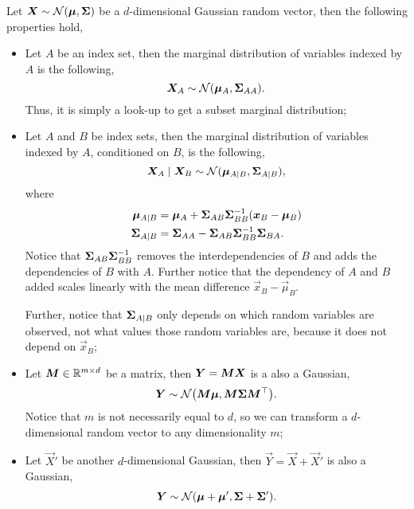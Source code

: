 Let $\bm{X} \sim \mathcal{N}(\bm{\mu},\bm{\Sigma})$ be a $d$-dimensional
Gaussian random vector, then the following properties hold,
\begin{itemize}
    \item Let $A$ be an index set, then the marginal distribution of variables
          indexed by $A$ is the following, \[
              \bm{X}_A \sim \mathcal{N}(\bm{\mu}_A,\bm{\Sigma}_{AA}).
          \]
          Thus, it is simply a look-up to get a subset marginal distribution;

    \item Let $A$ and $B$ be index sets, then the marginal distribution of
          variables indexed by $A$, conditioned on $B$, is the following, \[
              \bm{X}_A\mid \bm{X}_B \sim \mathcal{N}(\bm{\mu}_{A\mid B},\bm{\Sigma}_{A\mid B}),
          \]
          where
          \begin{align*}
              \bm{\mu}_{A\mid B}    & = \bm{\mu}_A + \bm{\Sigma}_{AB}\bm{\Sigma}_{BB}^{-1} (\bm{x}_B - \bm{\mu}_B) \\
              \bm{\Sigma}_{A\mid B} & = \bm{\Sigma}_{AA} - \bm{\Sigma}_{AB}\bm{\Sigma}_{BB}^{-1}\bm{\Sigma}_{BA}.
          \end{align*}
          Notice that $\bm{\Sigma}_{AB}\bm{\Sigma}_{BB}^{-1}$ removes the interdependencies
          of $B$ and adds the dependencies of $B$ with $A$. Further notice that the
          dependency of $A$ and $B$ added scales linearly with the mean difference
          $\vec{x}_B - \vec{\mu}_B$.

          Further, notice that $\bm{\Sigma}_{A\mid B}$ only depends on which random
          variables are observed, not what values those random variables are, because
          it does not depend on $\vec{x}_B$;

    \item Let $\bm{M}\in\mathbb{R}^{m\times d}$ be a matrix, then $\bm{Y} =
              \bm{M}\bm{X}$ is a also a Gaussian, \[
              \vec{Y} \sim \mathcal{N}\lft( \mat{M}\vec{\mu}, \mat{M}\mat{\Sigma}\transpose{\mat{M}} \rgt).
          \]
          Notice that $m$ is not necessarily equal to $d$, so we can transform a
          $d$-dimensional random vector to any dimensionality $m$;

    \item Let $\vec{X}'$ be another $d$-dimensional Gaussian, then
          $\vec{Y}=\vec{X}+\vec{X}'$ is also a Gaussian, \[
              \vec{Y} \sim \mathcal{N} \lft( \vec{\mu} + \vec{\mu}', \mat{\Sigma} + \mat{\Sigma}' \rgt).
          \]
\end{itemize}

